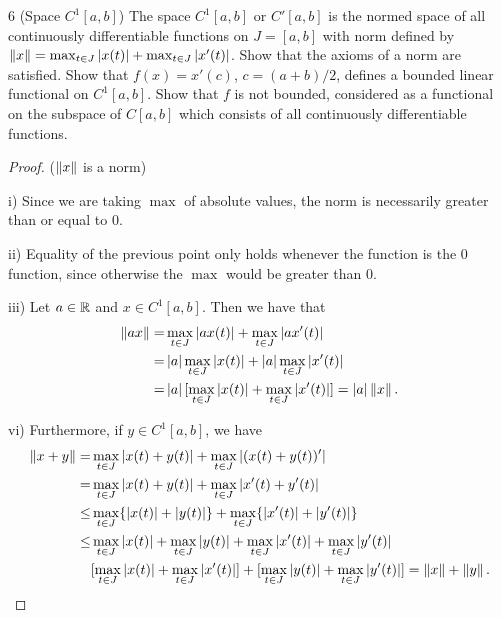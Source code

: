 \begin{exercise}{6 (Space $C^1[a,b]$)}
The space $C^1[a,b]$ or $C'[a,b]$ is the normed space of all continuously differentiable functions on $J=[a,b]$ with norm defined by $\left\lVert x\right\rVert=\max_{t\in J}\left\lvert x(t)\right\rvert+\max_{t\in J}\left\lvert x'(t)\right\rvert$. Show that the axioms of a norm are satisfied. 
Show that $f(x)=x'(c)$, $c=(a+b)/2$, defines a bounded linear functional on $C^1[a,b]$. 
Show that $f$ is not bounded, considered as a functional on the subspace of $C[a,b]$ which consists of all continuously differentiable functions.
\end{exercise}
\begin{proof}
($\left\lVert x\right\rVert$ is a norm)

i) Since we are taking $\max$ of absolute values, the norm is necessarily greater than or equal to 0.

ii) Equality of the previous point only holds whenever the function is the 0 function, since otherwise the $\max$ would be greater than 0.

iii) Let $a\in\mathbb{R}$ and $x\in C^1[a,b]$. Then we have that 
\begin{align*}
\left\lVert a x\right\rVert 
=& \max_{t\in J}\left\lvert a x(t)\right\rvert 
+ \max_{t\in J}\left\lvert a x'(t)\right\rvert\\
=& \left\lvert a\right\rvert\max_{t\in J}\left\lvert x(t)\right\rvert 
+ \left\lvert a\right\rvert\max_{t\in J}\left\lvert x'(t)\right\rvert\\
=& \left\lvert a\right\rvert[\max_{t\in J}\left\lvert x(t)\right\rvert 
 + \max_{t\in J}\left\lvert x'(t)\right\rvert] = \left\lvert a\right\rvert\left\lVert x\right\rVert.
\end{align*}

vi) Furthermore, if $y\in C^1[a,b]$, we have
\begin{align*}
    \left\lVert x+y\right\rVert
=& \max_{t\in J}\left\lvert x(t) + y(t)\right\rvert 
+ \max_{t\in J}\left\lvert (x(t) +y(t))'\right\rvert\\
=& \max_{t\in J}\left\lvert x(t) + y(t)\right\rvert 
+ \max_{t\in J}\left\lvert x'(t) + y'(t)\right\rvert\\
\leq& \max_{t\in J}\{\left\lvert x(t)\right\rvert + \left\lvert y(t)\right\rvert\}
+ \max_{t\in J}\{\left\lvert x'(t)\right\rvert + \left\lvert y'(t)\right\rvert\}\\
\leq& \max_{t\in J}\left\lvert x(t)\right\rvert 
+ \max_{t\in J}\left\lvert y(t)\right\rvert
+ \max_{t\in J}\left\lvert x'(t)\right\rvert 
+ \max_{t\in J}\left\lvert y'(t)\right\rvert\\
& [\max_{t\in J}\left\lvert x(t)\right\rvert 
+ \max_{t\in J}\left\lvert x'(t)\right\rvert]
+ [\max_{t\in J}\left\lvert y(t)\right\rvert
+ \max_{t\in J}\left\lvert y'(t)\right\rvert] 
=\left\lVert x\right\rVert+\left\lVert y\right\rVert.
\end{align*}


\end{proof}
